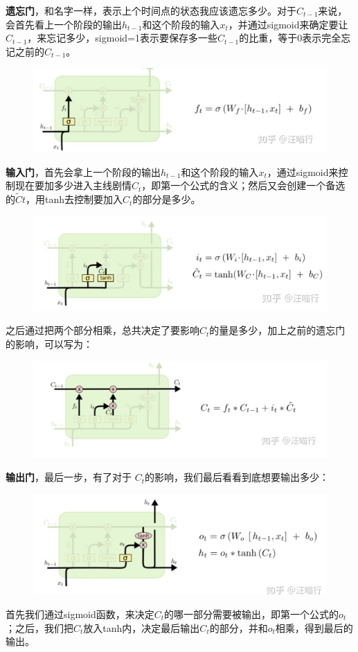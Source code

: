 \documentclass[12pt]{article}
\begin{document}
\textbf{遗忘门}，和名字一样，表示上个时间点的状态我应该遗忘多少。对于$C_{t-1}$来说，会首先看上一个阶段的输出$h_{t-1}$和这个阶段的输入$x_{t}$，并通过sigmoid来确定要让$C_{t-1}$，来忘记多少，sigmoid=1表示要保存多一些$C_{t-1}$的比重，等于0表示完全忘记之前的$C_{t-1}$。
\begin{figure}[H]
    \centering
    \includegraphics[width=.8\textwidth]{fig/LSTM_Gate_Forget.png}
\end{figure}

\textbf{输入门}，首先会拿上一个阶段的输出$h_{t-1}$和这个阶段的输入$x_{t}$，通过sigmoid来控制现在要加多少进入主线剧情$C_t$，即第一个公式的含义；然后又会创建一个备选的$\tilde{C}t$，用tanh去控制要加入$C_t$的部分是多少。
\begin{figure}[H]
    \centering
    \includegraphics[width=.8\textwidth]{fig/LSTM_Gate_Input.png}
\end{figure}

之后通过把两个部分相乘，总共决定了要影响$C_t$的量是多少，加上之前的遗忘门的影响，可以写为：
\begin{figure}[H]
    \centering
    \includegraphics[width=.8\textwidth]{fig/LSTM_Gate_Forget_Input.png}
\end{figure}

\textbf{输出门}，最后一步，有了对于 $C_t$的影响，我们最后看看到底想要输出多少：
\begin{figure}[H]
    \centering
    \includegraphics[width=.8\textwidth]{fig/LSTM_Gate_Output.png}
\end{figure}
首先我们通过sigmoid函数，来决定$C_t$的哪一部分需要被输出，即第一个公式的$o_t$；之后，我们把$C_t$放入tanh内，决定最后输出$C_t$的部分，并和$o_t$相乘，得到最后的输出。
\end{document}
